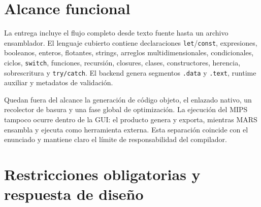 \documentclass[11pt,letterpaper,oneside]{report}
\newcommand{\codigo}[1]{\texttt{#1}}
\begin{document}
\section{Alcance funcional}

La entrega incluye el flujo completo desde texto fuente hasta un archivo ensamblador. El lenguaje cubierto contiene declaraciones \codigo{let}/\codigo{const}, expresiones, booleanos, enteros, flotantes, strings, arreglos multidimensionales, condicionales, ciclos, \codigo{switch}, funciones, recursi\'on, closures, clases, constructores, herencia, sobrescritura y \codigo{try/catch}. El backend genera segmentos \codigo{.data} y \codigo{.text}, runtime auxiliar y metadatos de validaci\'on.

Quedan fuera del alcance la generaci\'on de c\'odigo objeto, el enlazado nativo, un recolector de basura y una fase global de optimizaci\'on. La ejecuci\'on del MIPS tampoco ocurre dentro de la GUI: el producto genera y exporta, mientras MARS ensambla y ejecuta como herramienta externa. Esta separaci\'on coincide con el enunciado y mantiene claro el l\'imite de responsabilidad del compilador.

\section{Restricciones obligatorias y respuesta de dise\~no}
\end{document}
